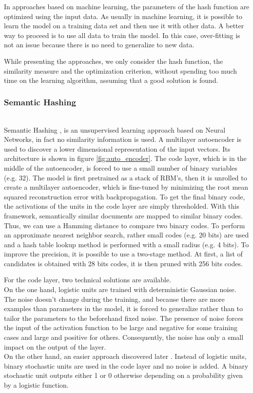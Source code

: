 In approaches based on machine learning, the parameters of the hash function are optimized using the input data. As usually in machine learning, it is possible to learn the model on a training data set and then use it with other data. A better way to proceed is to use all data to train the model. In this case, over-fitting is not an issue because there is no need to generalize to new data.

While presenting the approaches, we only consider the hash function, the similarity measure and the optimization criterion, without spending too much time on the learning algorithm, assuming that a good solution is found.

\subsubsection{Semantic Hashing}
~\\
Semantic Hashing \cite{salakhutdinov2007semantic},\cite{salakhutdinov2009semantic} is an unsupervised learning approach based on Neural Networks, in fact no similarity information is used. A multilayer autoencoder is used to discover a lower dimensional representation of the input vectors. Its architecture is shown in figure \ref{fig:auto_encoder}. The code layer, which is in the middle of the autoencoder, is forced to use a small number of binary variables (e.g. 32). The model is first pretrained as a stack of RBM's, then it is unrolled to create a multilayer autoencoder, which is fine-tuned by minimizing the root mean squared reconstruction error with backpropagation. To get the final binary code, the activations of the units in the code layer are simply thresholded. With this framework, semantically similar documents are mapped to similar binary codes. Thus, we can use a Hamming distance to compare two binary codes. To perform an approximate nearest neighbor search, rather small codes (e.g. 20 bits) are used and a hash table lookup method is performed with a small radius (e.g. 4 bits). To improve the precision, it is possible to use a two-stage method. At first, a list of candidates is obtained with 28 bits codes, it is then pruned with 256 bits codes.

For the code layer, two technical solutions are available. \\
On the one hand, logistic units are trained with deterministic Gaussian noise. The noise doesn't change during the training, and because there are more examples than parameters in the model, it is forced to generalize rather than to tailor the parameters to the beforehand fixed noise. The presence of noise forces the input of the activation function to be large and negative for some training cases and large and positive for others. Consequently, the noise has only a small impact on the output of the layer. \\
On the other hand, an easier approach discovered later \cite{krizhevsky2011using}. Instead of logistic units, binary stochastic units are used in the code layer and no noise is added. A binary stochastic unit outputs either 1 or 0 otherwise depending on a probability given by a logistic function.

